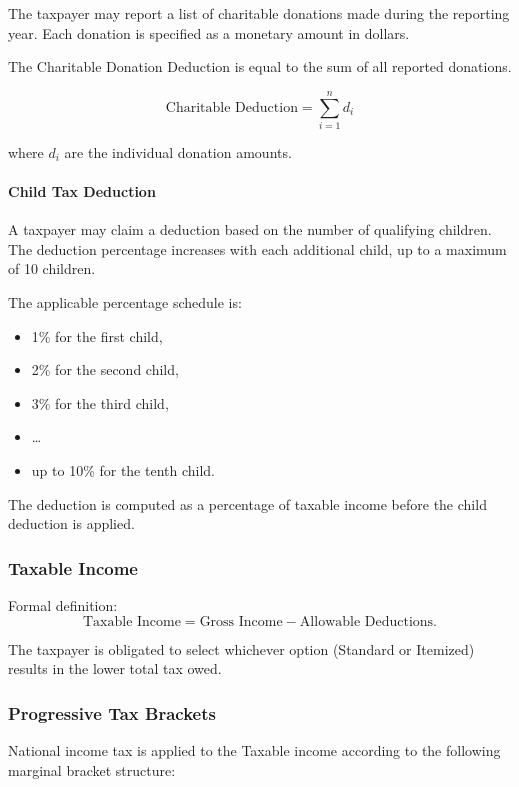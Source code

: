 The taxpayer may report a list of charitable donations made during the reporting year.
Each donation is specified as a monetary amount in dollars.

The Charitable Donation Deduction is equal to the sum of all reported donations.

\[
\text{Charitable Deduction} = \sum_{i=1}^{n} d_i
\]

where $d_i$ are the individual donation amounts.

\medskip

\paragraph{Child Tax Deduction}

A taxpayer may claim a deduction based on the number of qualifying children.
The deduction percentage increases with each additional child, up to a maximum of 10 children.

The applicable percentage schedule is:

\begin{itemize}
  \item 1\% for the first child,
  \item 2\% for the second child,
  \item 3\% for the third child,
  \item \dots
  \item up to 10\% for the tenth child.
\end{itemize}

The deduction is computed as a percentage of taxable income before the child deduction is applied.

\subsubsection{Taxable Income}

Formal definition:
\[
\text{Taxable Income} = \text{Gross Income} - \text{Allowable Deductions}.
\]

The taxpayer is obligated to select whichever option (Standard or Itemized) results in the lower total tax owed.

\subsubsection{Progressive Tax Brackets}

National income tax is applied to the Taxable income according to the following marginal bracket structure:

